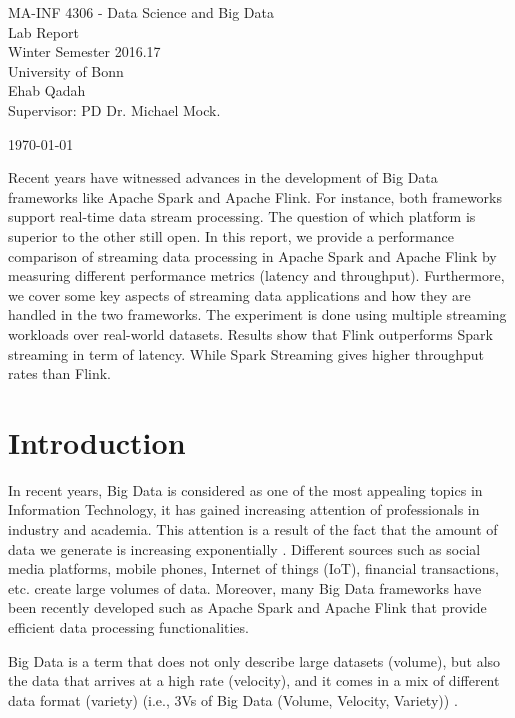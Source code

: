 \documentclass[]{article}
\begin{document}
\begin{flushleft}

\vspace{4pt}

\centering
 MA-INF 4306 - Data Science and Big Data \\
 Lab Report\\
 
   Winter Semester 2016.17\\

		 University of Bonn\\


\vspace{6pt}
\centering
 Ehab Qadah\\
 Supervisor: PD Dr. Michael Mock.
 \vspace{4pt}
 
 \today
\end{flushleft}


\begin{abstract}

\end{abstract}
Recent years have witnessed advances in the  development of Big Data frameworks like Apache Spark and Apache Flink. For instance, both frameworks support real-time data 
stream processing. The question of which platform is superior to the other still open. 
In this report, we provide a performance comparison of streaming data processing in Apache Spark and Apache Flink by measuring different performance metrics (latency and throughput). Furthermore, we cover some key aspects of streaming data applications and how they are handled in the two frameworks. The experiment is done using multiple streaming workloads over real-world datasets. Results show that Flink outperforms Spark streaming in term of latency. While Spark Streaming gives higher throughput rates than Flink. 
\section{Introduction}

\par In recent years, Big Data is considered as one of the most appealing topics in Information Technology, it has gained increasing attention of professionals in industry and academia. This attention is a result of the fact that the amount of data we generate is increasing exponentially \cite{idc}.  Different sources such as  social media platforms, mobile phones, Internet of things (IoT), financial transactions, etc.  create large volumes of data.  Moreover, many Big Data frameworks have been recently developed such as Apache Spark and Apache Flink that provide efficient data processing functionalities.
 \par Big Data is a term that does not only describe large datasets (volume), but also the data that arrives at a high rate (velocity), and it comes in a mix of different data format (variety) (i.e., 3Vs of Big Data (Volume, Velocity, Variety)) \cite{svs}.
\end{document}
